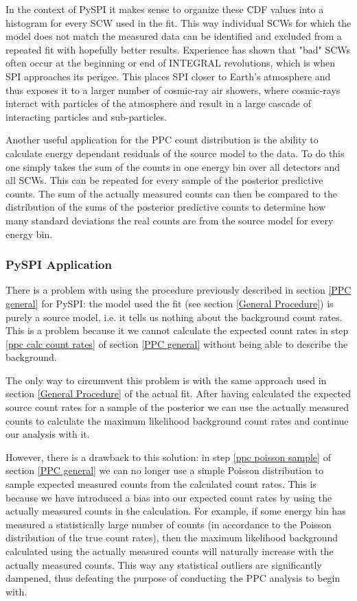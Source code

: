 \documentclass{report}
\begin{document}
In the context of PySPI it makes sense to organize these CDF values into a histogram for every SCW used in the fit. This way individual SCWs for which the model does not match the measured data can be identified and excluded from a repeated fit with hopefully better results. Experience has shown that "bad" SCWs often occur at the beginning or end of INTEGRAL revolutions, which is when SPI approaches its perigee. This places SPI closer to Earth's atmosphere and thus exposes it to a larger number of cosmic-ray air showers, where cosmic-rays interact with particles of the atmosphere and result in a large cascade of interacting particles and sub-particles.

Another useful application for the PPC count distribution is the ability to calculate energy dependant residuals of the source model to the data. To do this one simply takes the sum of the counts in one energy bin over all detectors and all SCWs. This can be repeated for every sample of the posterior predictive counts. The sum of the actually measured counts can then be compared to the distribution of the sums of the posterior predictive counts to determine how many standard deviations the real counts are from the source model for every energy bin. 

\subsubsection{PySPI Application}
There is a problem with using the procedure previously described in section \ref{PPC general} for PySPI: the model used the fit (see section \ref{General Procedure}) is purely a source model, i.e. it tells us nothing about the background count rates. This is a problem because it we cannot calculate the expected count rates in step \ref{ppc calc count rates} of section \ref{PPC general} without being able to describe the background.

The only way to circumvent this problem is with the same approach used in section \ref{General Procedure} of the actual fit. After having calculated the expected source count rates for a sample of the posterior we can use the actually measured counts to calculate the maximum likelihood background count rates and continue our analysis with it.

However, there is a drawback to this solution: in step \ref{ppc poisson sample} of section \ref{PPC general} we can no longer use a simple Poisson distribution to sample expected measured counts from the calculated count rates. This is because we have introduced a bias into our expected count rates by using the actually measured counts in the calculation. For example, if some energy bin has measured a statistically large number of counts (in accordance to the Poisson distribution of the true count rates), then the maximum likelihood background calculated using the actually measured counts will naturally increase with the actually measured counts. This way any statistical outliers are significantly dampened, thus defeating the purpose of conducting the PPC analysis to begin with.
\end{document}
